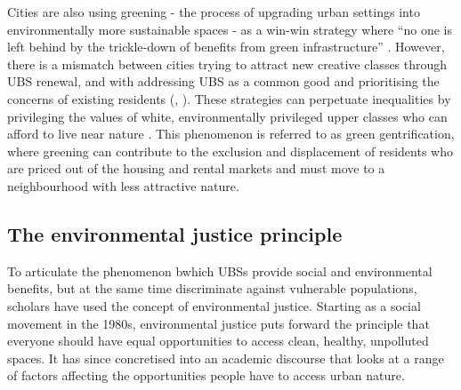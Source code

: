 \documentclass{article}
\begin{document}
Cities are also using greening - the process of upgrading urban settings into environmentally more sustainable spaces - as a win-win strategy where ``no one is left behind by the trickle-down of benefits from green infrastructure'' \parencite{anguelovski2021green}. However, there is a mismatch between cities trying to attract new creative classes through UBS renewal, and with addressing UBS as a common good and prioritising the concerns of existing residents (\cite{wessells2014urban}, \cite{anguelovski2020expanding}).
These strategies can perpetuate inequalities by privileging the values of white, environmentally privileged upper classes who can afford to live near nature \parencite{anguelovski2021green}. This phenomenon is referred to as green gentrification, where greening can contribute to the exclusion and displacement of residents who are priced out of the housing and rental markets and must move to a neighbourhood with less attractive nature.

\subsection{The environmental justice principle}

To articulate the phenomenon bwhich UBSs provide social and environmental benefits, but at the same time discriminate against vulnerable populations, scholars have used the concept of environmental justice.
Starting as a social movement in the 1980s, environmental justice puts forward the principle that everyone should have equal opportunities to access clean, healthy, unpolluted spaces. It has since concretised into an academic discourse that looks at a range of factors affecting the opportunities people have to access urban nature. 



\end{document}
